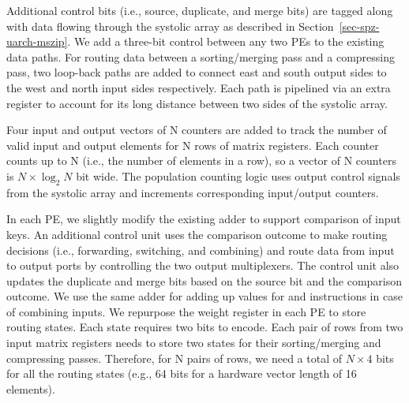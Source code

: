 Additional control bits (i.e., source, duplicate, and merge bits) are tagged
along with data flowing through the systolic array as described in
Section~\ref{sec-spz-uarch-mszip}.
We add a three-bit control between any two PEs to the existing data paths.
For routing data between a sorting/merging pass and a compressing pass, two
loop-back paths are added to connect east and south output sides to the west
and north input sides respectively.
Each path is pipelined via an extra register to account for its long distance
between two sides of the systolic array.

Four input and output vectors of N counters are added to track the number of
valid input and output elements for N rows of matrix registers.
Each counter counts up to N (i.e., the number of elements in a row), so a
vector of N counters is $N \times \log_2 N$ bit wide.
The population counting logic uses output control signals from the systolic
array and increments corresponding input/output counters.

In each PE, we slightly modify the existing adder to support comparison of
input keys.
An additional control unit uses the comparison outcome to make routing
decisions (i.e., forwarding, switching, and combining) and route data from
input to output ports by controlling the two output multiplexers.
The control unit also updates the duplicate and merge bits based on the source
bit and the comparison outcome.
We use the same adder for adding up values for  and 
instructions in case of combining inputs.
We repurpose the weight register in each PE to store routing states.
Each state requires two bits to encode.
Each pair of rows from two input matrix registers needs to store two states for
their sorting/merging and compressing passes.
Therefore, for N pairs of rows, we need a total of $N \times 4$ bits for all
the routing states (e.g., 64 bits for a hardware vector length of 16
elements).
